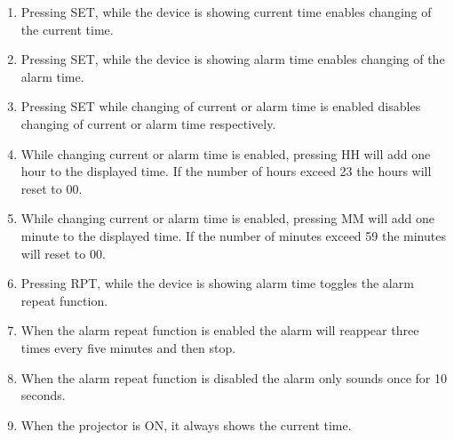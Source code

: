 \documentclass[Main_Assignment2]{subfiles}
\begin{document}
\begin{enumerate}[label=RE\arabic*:]
	\item
	Pressing SET, while the device is showing current time enables changing of the current time.

	\item
	Pressing SET, while the device is showing alarm time enables changing of the alarm time.

	\item
	Pressing SET while changing of current or alarm time is enabled disables changing of current or alarm time respectively.

	\item
	While changing current or alarm time is enabled, pressing HH will add one hour to the displayed time. If the number of hours exceed 23 the hours will reset to 00.

	\item
	While changing current or alarm time is enabled, pressing MM will add one minute to the displayed time. If the number of minutes exceed 59 the minutes will reset to 00.

	\item 
	Pressing RPT, while the device is showing alarm time toggles the alarm repeat function.

	\item
	When the alarm repeat function is enabled the alarm will reappear three times every five minutes and then stop.

	\item
	When the alarm repeat function is disabled the alarm only sounds once for 10 seconds.

	\item
	When the projector is ON, it always shows the current time.

\end{enumerate}
\end{document}
